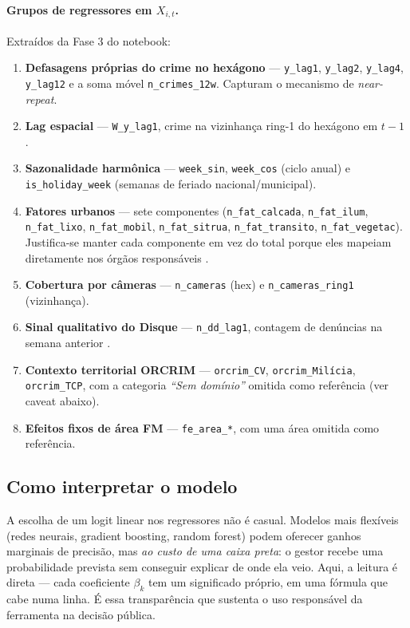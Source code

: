 \documentclass[11pt,a4paper]{article}
\begin{document}
\paragraph{Grupos de regressores em $X_{i,t}$.} Extraídos da Fase 3 do
notebook:
\begin{enumerate}
  \item \textbf{Defasagens próprias do crime no hexágono} ---
        \texttt{y\_lag1}, \texttt{y\_lag2}, \texttt{y\_lag4},
        \texttt{y\_lag12} e a soma móvel \texttt{n\_crimes\_12w}.
        Capturam o mecanismo de \emph{near-repeat}.
  \item \textbf{Lag espacial} --- \texttt{W\_y\_lag1}, crime na
        vizinhança ring-1 do hexágono em $t{-}1$ \cite{JohnsonBowers2004}.
  \item \textbf{Sazonalidade harmônica} --- \texttt{week\_sin},
        \texttt{week\_cos} (ciclo anual) e \texttt{is\_holiday\_week}
        (semanas de feriado nacional/municipal).
  \item \textbf{Fatores urbanos} --- sete componentes
        (\texttt{n\_fat\_calcada}, \texttt{n\_fat\_ilum},
        \texttt{n\_fat\_lixo}, \texttt{n\_fat\_mobil},
        \texttt{n\_fat\_sitrua}, \texttt{n\_fat\_transito},
        \texttt{n\_fat\_vegetac}). Justifica-se manter cada componente
        em vez do total porque eles mapeiam diretamente nos órgãos
        responsáveis \cite{ObrienSampson2015, ChalfinEtAl2019}.
  \item \textbf{Cobertura por câmeras} --- \texttt{n\_cameras}
        (hex) e \texttt{n\_cameras\_ring1} (vizinhança).
  \item \textbf{Sinal qualitativo do Disque} ---
        \texttt{n\_dd\_lag1}, contagem de denúncias na semana anterior
        \cite{Wheeler2018}.
  \item \textbf{Contexto territorial ORCRIM} ---
        \texttt{orcrim\_CV}, \texttt{orcrim\_Mil\'icia},
        \texttt{orcrim\_TCP}, com a categoria
        \emph{``Sem domínio''} omitida como referência (ver caveat
        abaixo).
  \item \textbf{Efeitos fixos de área FM} ---
        \texttt{fe\_area\_*}, com uma área omitida como referência.
\end{enumerate}

\subsection{Como interpretar o modelo}
\label{ssec:pred_interpret}

A escolha de um logit linear nos regressores não é casual. Modelos mais
flexíveis (redes neurais, gradient boosting, random forest) podem
oferecer ganhos marginais de precisão, mas \emph{ao custo de uma caixa
preta}: o gestor recebe uma probabilidade prevista sem conseguir
explicar de onde ela veio. Aqui, a leitura é direta --- cada coeficiente
$\beta_k$ tem um significado próprio, em uma fórmula que cabe numa
linha. É essa transparência que sustenta o uso responsável da
ferramenta na decisão pública.
\end{document}
